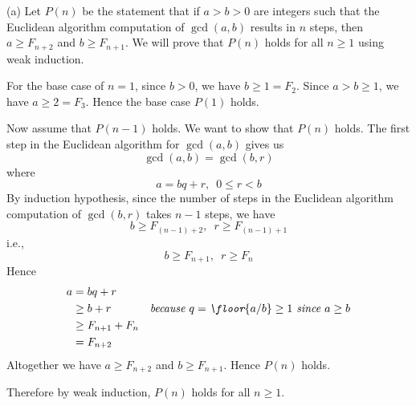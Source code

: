   (a)
Let $P(n)$ be the statement that if $a > b > 0$ are integers
such that the Euclidean algorithm computation of $\gcd(a,b)$
results in $n$ steps, then 
$a \geq F_{n+2}$ and
$b \geq F_{n+1}$.
We will prove that $P(n)$ holds for all $n \geq 1$ using
weak induction.

For the base case of $n = 1$,
since $b > 0$, we have $b \geq 1 = F_2$.
Since $a > b \geq 1$, we have $a \geq 2 = F_3$.
Hence the base case $P(1)$ holds.

Now assume that $P(n - 1)$ holds.
We want to show that $P(n)$ holds.
The first step in the Euclidean algorithm for $\gcd(a, b)$
gives us
\[
\gcd(a, b) = \gcd(b, r)
\]
where
\[
a = b q + r, \,\,\, 0 \leq r < b
\]
By induction hypothesis, since the number of steps in
the Euclidean algorithm computation of 
$\gcd(b, r)$ takes $n - 1$ steps, we have
\[
b \geq F_{(n - 1) + 2}, \,\,\, r \geq F_{(n - 1) + 1}
\]
i.e.,
\[
b \geq F_{n + 1}, \,\,\, r \geq F_{n}
\]
Hence
\begin{align*}
  a
  &= b q + r \\
  &\geq b + r & \textit{because $q = \floor{a/b} \geq 1$ since $a \geq b$} \\
  &\geq F_{n + 1} + F_n \\
  &= F_{n + 2}
\end{align*}
Altogether we have $a \geq F_{n + 2}$ and $b\geq F_{n + 1}$.
Hence $P(n)$ holds.

Therefore by weak induction, $P(n)$ holds for all $n \geq 1$.


